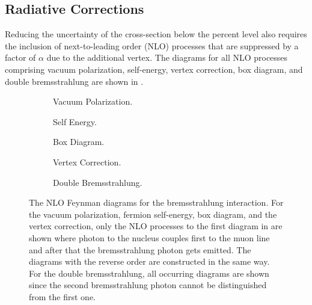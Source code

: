 \subsection{Radiative Corrections} \label{sec:brems_nlo}

Reducing the uncertainty of the cross-section below the percent level also requires the inclusion of next-to-leading order (NLO) processes that are suppressed by a factor of $\alpha$ due to the additional vertex.
The diagrams for all NLO processes comprising vacuum polarization, self-energy, vertex correction, box diagram, and double bremsstrahlung are shown in .
\begin{figure}
    \begin{subfigure}[t]{0.3\textwidth}
        \centering
        
        \caption{Vacuum Polarization.}
        \label{fig:feyn_brems_vacuum}
    \end{subfigure}
    \begin{subfigure}[t]{0.33\textwidth}
        \centering
        
        \caption{Self Energy.}
        \label{fig:feyn_brems_self}
    \end{subfigure}
    \begin{subfigure}[t]{0.33\textwidth}
        \centering
        
        \caption{Box Diagram.}
        \label{fig:feyn_brems_box}
    \end{subfigure}
    \begin{subfigure}{0.96\textwidth}
        \vspace{0.5cm}
        \centering
        
        \caption{Vertex Correction.}
        \label{fig:feyn_brems_vertex}
    \end{subfigure}
    \begin{subfigure}{0.96\textwidth}
        \vspace{0.5cm}
        \centering
        
        \caption{Double Bremsstrahlung.}
        \label{fig:feyn_brems_double}
    \end{subfigure}
    \caption{The NLO Feynman diagrams for the bremsstrahlung interaction. For the vacuum polarization, fermion self-energy, box diagram, and the vertex correction, only the NLO processes to the first diagram in  are shown where photon to the nucleus couples first to the muon line and after that the bremsstrahlung photon gets emitted. The diagrams with the reverse order are constructed in the same way. For the double bremsstrahlung, all occurring diagrams are shown since the second bremsstrahlung photon cannot be distinguished from the first one.}
    \label{fig:feyn_brems_nlo}
\end{figure}

